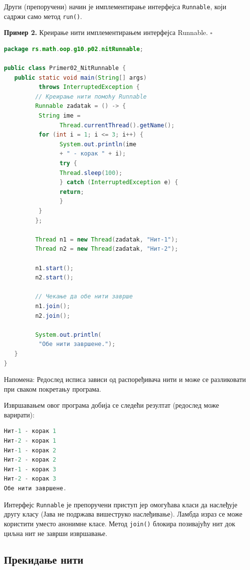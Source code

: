 Други (препоручени) начин је имплементирање интерфејса \texttt{Runnable}, који садржи само метод \texttt{run()}.


\bigskip

\noindent \textbf{Пример 2.} Креирање нити имплементирањем интерфејса Runnable. $\square$

\medskip


\begin{lstlisting}[language=Java]
package rs.math.oop.g10.p02.nitRunnable;
 
public class Primer02_NitRunnable {
   public static void main(String[] args)
          throws InterruptedException {
         // Креирање нити помоћу Runnable
         Runnable zadatak = () -> {
          String ime =
                Thread.currentThread().getName();
          for (int i = 1; i <= 3; i++) {
                System.out.println(ime
                + " - корак " + i);
                try {
                Thread.sleep(100);
                } catch (InterruptedException e) {
                return;
                }
          }
         };
 
         Thread n1 = new Thread(zadatak, "Нит-1");
         Thread n2 = new Thread(zadatak, "Нит-2");
 
         n1.start();
         n2.start();
 
         // Чекање да обе нити заврше
         n1.join();
         n2.join();
 
         System.out.println(
          "Обе нити завршене.");
   }
}
\end{lstlisting}


Напомена: Редослед исписа зависи од распоређивача нити и може се разликовати при сваком покретању програма.

Извршавањем овог програма добија се следећи резултат (редослед може варирати):


\begin{lstlisting}[language=Java]
Нит-1 - корак 1
Нит-2 - корак 1
Нит-1 - корак 2
Нит-2 - корак 2
Нит-1 - корак 3
Нит-2 - корак 3
Обе нити завршене.
\end{lstlisting}


Интерфејс \texttt{Runnable} је препоручени приступ јер омогућава класи да наслеђује другу класу (Јава не подржава вишеструко наслеђивање). Ламбда израз се може користити уместо анонимне класе. Метод \texttt{join()} блокира позивајућу нит док циљна нит не заврши извршавање.


\subsection{Прекидање нити}

